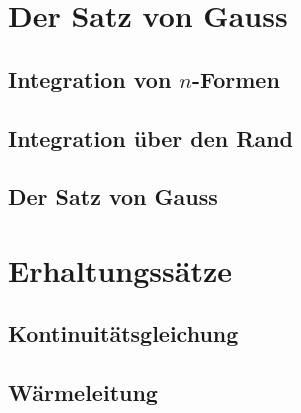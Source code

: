 \section{Der Satz von Gauss
\label{buch:gauss:section:satzvongauss}}

\subsection{Integration von $n$-Formen}

\subsection{Integration über den Rand}

\subsection{Der Satz von Gauss}

%
%
\section{Erhaltungssätze
\label{buch:gauss:section:erhaltungssatz}}

\subsection{Kontinuitätsgleichung}

\subsection{Wärmeleitung}

